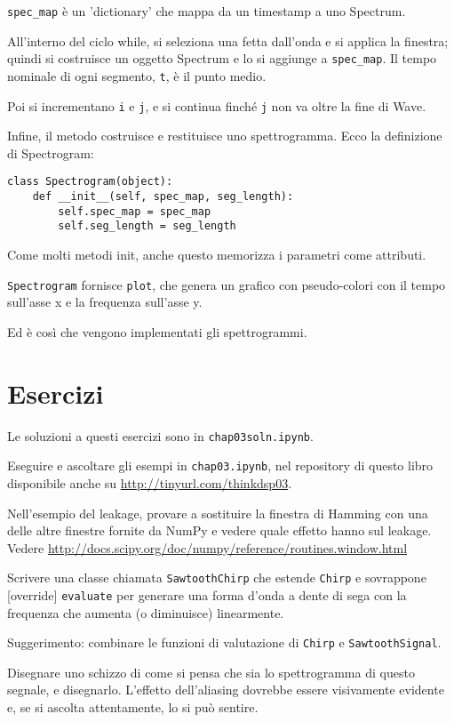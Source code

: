 \documentclass[12pt,a4paper]{book}
\begin{document}
\verb"spec_map" è un 'dictionary' che mappa da un timestamp a uno Spectrum.

All'interno del ciclo while, si seleziona una fetta dall'onda e si applica la finestra; quindi si costruisce un oggetto Spectrum e lo si aggiunge a \verb"spec_map". Il tempo nominale di ogni segmento, {\tt t}, è il punto medio.

Poi si incrementano {\tt i} e {\tt j}, e si continua finché {\tt j} non va oltre la fine di Wave.

Infine, il metodo costruisce e restituisce uno spettrogramma. Ecco la definizione di Spectrogram:

\begin{verbatim} 
class Spectrogram(object):
    def __init__(self, spec_map, seg_length):
        self.spec_map = spec_map
        self.seg_length = seg_length
 \end{verbatim} 

Come molti metodi init, anche questo memorizza i parametri come attributi.

{\tt Spectrogram} fornisce {\tt plot}, che genera un grafico con pseudo-colori con il tempo sull'asse x e la frequenza sull'asse y.

Ed è così che vengono implementati gli spettrogrammi.

\section{Esercizi} 

Le soluzioni a questi esercizi sono in {\tt chap03soln.ipynb}.

\begin{exercise} Eseguire e ascoltare gli esempi in {\tt chap03.ipynb}, nel repository di questo libro disponibile anche su \url{http://tinyurl.com/thinkdsp03}.

Nell'esempio del leakage, provare a sostituire la finestra di Hamming con una delle altre finestre fornite da NumPy e vedere quale effetto hanno sul leakage. Vedere \url{http://docs.scipy.org/doc/numpy/reference/routines.window.html} \end{exercise} 

\begin{exercise} Scrivere una classe chiamata {\tt SawtoothChirp} che estende {\tt Chirp} e sovrappone [override] {\tt evaluate} per generare una forma d'onda a dente di sega con la frequenza che aumenta (o diminuisce) linearmente.

Suggerimento: combinare le funzioni di valutazione di {\tt Chirp} e {\tt SawtoothSignal}.

Disegnare uno schizzo di come si pensa che sia lo spettrogramma di questo segnale, e disegnarlo. L'effetto dell'aliasing dovrebbe essere visivamente evidente e, se si ascolta attentamente, lo si può sentire. \end{exercise} 
\end{document}
